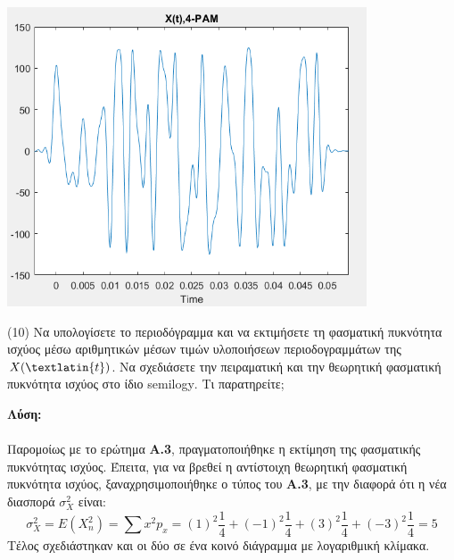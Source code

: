 \begin{center}
    \centering
    \includegraphics[width=0.8\textwidth]{ALPHA/images/a4.png} %
\end{center}


\begin{justify}
    (10) Να υπολογίσετε το περιοδόγραμμα και να εκτιμήσετε τη φασματική πυκνότητα
    ισχύος μέσω αριθμητικών μέσων τιμών υλοποιήσεων περιοδογραμμάτων της $X(\textlatin{t})$. Να
    σχεδιάσετε την πειραματική και την θεωρητική φασματική πυκνότητα ισχύος στο ίδιο
    \textlatin{semilogy}. Τι παρατηρείτε\textlatin{;}
\end{justify}

\begin{justify}
    {\bf Λύση:}\\\\
    Παρομοίως με το ερώτημα {\bf Α.3}, πραγματοποιήθηκε η εκτίμηση
    της φασματικής πυκνότητας ισχύος. Έπειτα, για να βρεθεί η 
    αντίστοιχη θεωρητική φασματική πυκνότητα ισχύος, ξαναχρησιμοποιήθηκε
    ο τύπος του {\bf Α.3}, με την διαφορά ότι η νέα
    διασπορά $\sigma_X^2$ είναι:
    \[
         \sigma_X^2 = E(X_n^2)=\sum x^2p_x=(1)^2\frac{1}{4}+(-1)^2\frac{1}{4}
         +(3)^2\frac{1}{4}+(-3)^2\frac{1}{4}=5
    \]
    Τέλος σχεδιάστηκαν και οι δύο σε ένα κοινό διάγραμμα με
    λογαριθμική κλίμακα.
\end{justify}

